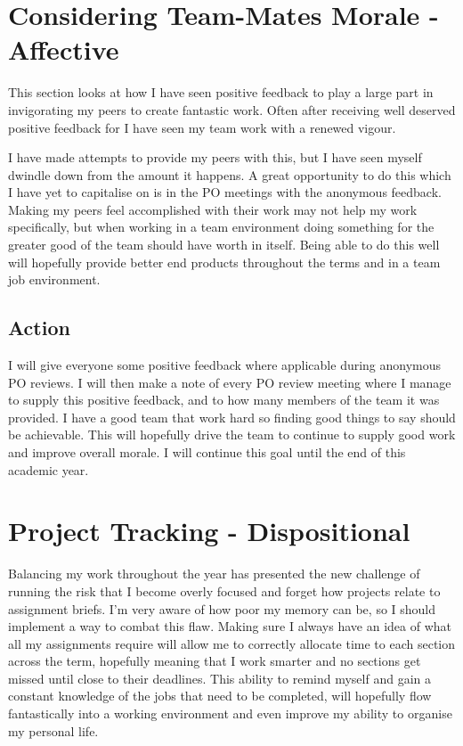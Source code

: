 \documentclass{scrartcl}
\begin{document}
\section{Considering Team-Mates Morale - Affective}
This section looks at how I have seen positive feedback to play a large part in invigorating my peers to create fantastic work. Often after receiving well deserved positive feedback for I have seen my team work with a renewed vigour.

I have made attempts to provide my peers with this, but I have seen myself dwindle down from the amount it happens. A great opportunity to do this which I have yet to capitalise on is in the PO meetings with the anonymous feedback. Making my peers feel accomplished with their work may not help my work specifically, but when working in a team environment doing something for the greater good of the team should have worth in itself. Being able to do this well will hopefully provide better end products throughout the terms and in a team job environment.
\subsection{Action}
I will give everyone some positive feedback where applicable during anonymous PO reviews. I will then make a note of every PO review meeting where I manage to supply this positive feedback, and to how many members of the team it was provided. I have a good team that work hard so finding good things to say should be achievable. This will hopefully drive the team to continue to supply good work and improve overall morale. I will continue this goal until the end of this academic year.

\section{Project Tracking - Dispositional}
Balancing my work throughout the year has presented the new challenge of running the risk that I become overly focused and forget how projects relate to assignment briefs. I'm very aware of how poor my memory can be, so I should implement a way to combat this flaw. Making sure I always have an idea of what all my assignments require will allow me to correctly allocate time to each section across the term, hopefully meaning that I work smarter and no sections get missed until close to their deadlines. This ability to remind myself and gain a constant knowledge of the jobs that need to be completed, will hopefully flow fantastically into a working environment and even improve my ability to organise my personal life.
\end{document}

